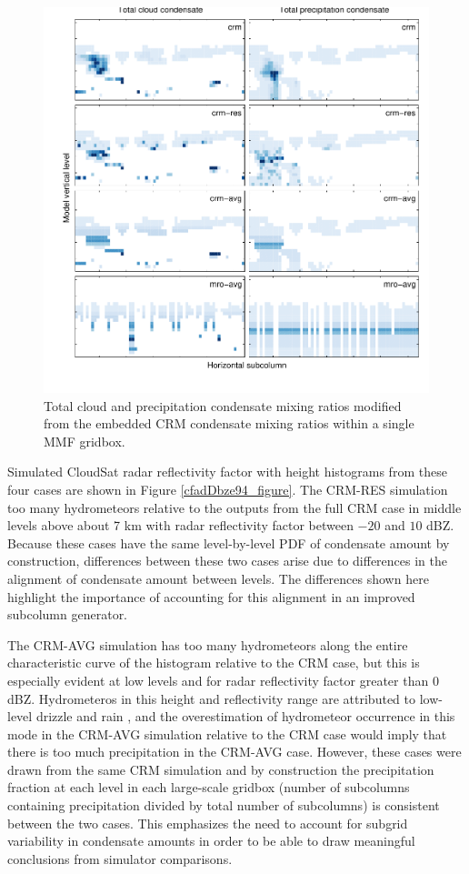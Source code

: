 \documentclass[letter]{article}
\begin{document}
\begin{figure}
\centering
\includegraphics{test_subgrid.pdf}
\caption{Total cloud and precipitation condensate mixing ratios modified from the embedded CRM condensate mixing ratios within a single MMF gridbox.}
\label{subgrid_fields}
\end{figure}

Simulated CloudSat \citep{stephens_et_al_2002} radar reflectivity factor with height histograms from these four cases are shown in Figure \ref{cfadDbze94_figure}. The CRM-RES simulation too many hydrometeors relative to the outputs from the full CRM case in middle levels above about 7 km with radar reflectivity factor between $-20$ and $10$ dBZ. Because these cases have the same level-by-level PDF of condensate amount by construction, differences between these two cases arise due to differences in the alignment of condensate amount between levels. The differences shown here highlight the importance of accounting for this alignment in an improved subcolumn generator. 

The CRM-AVG simulation has too many hydrometeors along the entire characteristic curve of the histogram relative to the CRM case, but this is especially evident at low levels and for radar reflectivity factor greater than $0$ dBZ. Hydrometeros in this height and reflectivity range are attributed to low-level drizzle and rain \citep{marchand_et_al_2009}, and the overestimation of hydrometeor occurrence in this mode in the CRM-AVG simulation relative to the CRM case would imply that there is too much precipitation in the CRM-AVG case. However, these cases were drawn from the same CRM simulation and by construction the precipitation fraction at each level in each large-scale gridbox (number of subcolumns containing precipitation divided by total number of subcolumns) is consistent between the two cases. This emphasizes the need to account for subgrid variability in condensate amounts in order to be able to draw meaningful conclusions from simulator comparisons.
\end{document}
